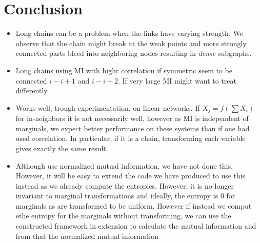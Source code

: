 \documentclass[../Thesis.tex]{subfiles}
\begin{document}
\chapter{Conclusion}\label{chap:conclusion}
\begin{itemize}
    \item Long chains can be a problem when the links have varying strength. We observe that the chain might break at the weak points and more strongly connected parts bleed into neighboring nodes resulting in \textit{dense} subgraphs.
    \item Long chains using MI with highr correlation if symmetric seem to be connected $i - i+1$ and $i - i+2$. If very large MI might want to treat differently.
    \item Works well, trough experimentation, on linear networks. If $X_j = f(\sum X_i)$ for in-neighbors it is not necessarily well, however as MI is independent of marginals, we expect better performance on these systems than if one had used correlation. In particular, if it is a chain, transforming each variable gives exactly the same result.
    \item Although \cite{An_effective_approach_for_causal_variables_analysis_in_diesel_engine_production_by_using_mutual_information_and_network_deconvolution} use normalized mutual information, we have not done this. However, it will be easy to extend the code we have produced to use this instead as we already compute the entropies. However, it is no longer invariant to marginal transformations and ideally, the entropy is 0 for marginals as are transformed to be uniform. However if instead we comput ethe entropy for the marginals without transforming, we can use the constructed framework in extension to calculate the mutual information and from that the normalized mutual information
\end{itemize}
\end{document}
